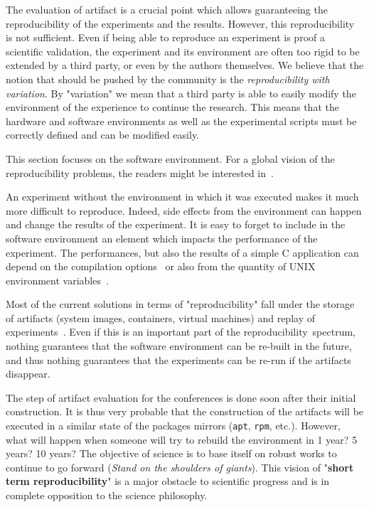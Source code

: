 \documentclass[sigconf,natbib=false]{acmart}
\newcommand{\repro}{reproducibility}
\begin{document}
The evaluation of artifact is a crucial point which allows guaranteeing the reproducibility of the experiments and the results.
However, this reproducibility is not sufficient.
Even if being able to reproduce an experiment is proof a scientific validation, the experiment and its environment are often too rigid to be extended by a third party, or even by the authors themselves. 
We believe that the notion that should be pushed by the community is the \emph{reproducibility with variation}.
By "variation" we mean that a third party is able to easily modify the environment of the experience to continue the research.
This means that the hardware and software environments as well as the experimental scripts must be correctly defined and can be modified easily.

This section focuses on the software environment.
For a global vision of the reproducibility problems, the readers might be interested in\ \cite{ivie2018reproducibility}.

An experiment without the environment in which it was executed makes it much more difficult to reproduce.
Indeed, side effects from the environment can happen and change the results of the experiment.
It is easy to forget to include in the software environment an element which impacts the performance of the experiment.
The performances, but also the results of a simple C application can depend on the compilation options\ \cite{stodden2018assessing} or also from the quantity of UNIX environment variables\ \cite{mytkowicz2009producing}.

Most of the current solutions in terms of "\repro" fall under the storage of artifacts (system images, containers, virtual machines) and replay of experiments\ \cite{rosendo2020e2clab, brammer2011paper, brinckman2019computing}.
Even if this is an important part of the \repro\ spectrum, nothing guarantees that the software environment can be re-built in the future, and thus nothing guarantees that the experiments can be re-run if the artifacts disappear. 


The step of artifact evaluation for the conferences is done soon after their initial construction.
It is thus very probable that the construction of the artifacts will be executed in a similar state of the packages mirrors (\texttt{apt}, \texttt{rpm}, etc.).
However, what will happen when someone will try to rebuild the environment in 1 year? 5 years? 10 years?
The objective of science is to base itself on robust works to continue to go forward (\emph{Stand on the shoulders of giants}).
This vision of "\textbf{short term reproducibility}" is a major obstacle to scientific progress and is in complete opposition to the science philosophy.
\end{document}
